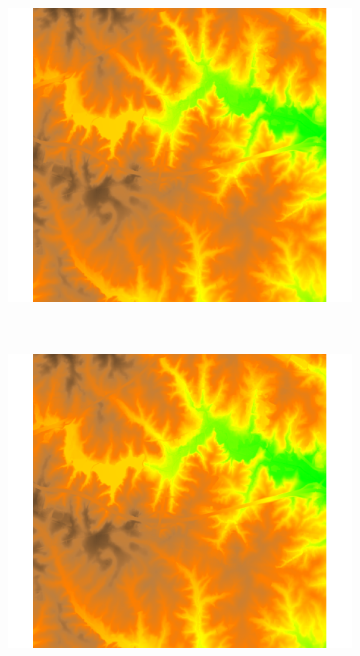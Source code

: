 \documentclass[10pt]{article}
\newcommand{\twobytwoimgwidth}{0.4\textwidth}
\begin{document}
\begin{figure}[htbp]
  \centering
  \begin{subfigure}[b]{\twobytwoimgwidth}
    \includegraphics[width=\textwidth]{report_template_image}
    \caption{}
  \end{subfigure}%
  ~ %
  \begin{subfigure}[b]{\twobytwoimgwidth}
    \includegraphics[width=\textwidth]{report_template_image}

\end{subfigure}
\end{figure}
\end{document}
